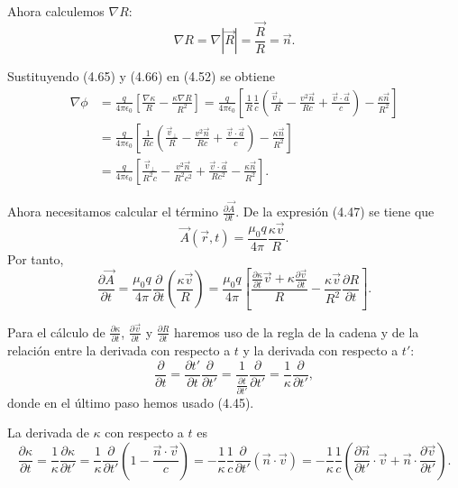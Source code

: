 \documentclass[12pt,a4paper]{book}
\begin{document}
Ahora calculemos $\nabla R$:
\begin{equation}
\nabla R = \nabla|\vec{R}| = \frac{\vec{R}}{R} = \vec{n}.
\end{equation}

Sustituyendo (4.65) y (4.66) en (4.52) se obtiene
\begin{align}
\nabla\phi &= \frac{q}{4\pi\epsilon_0}\left[\frac{\nabla\kappa}{R} - \frac{\kappa\nabla R}{R^2}\right] = \frac{q}{4\pi\epsilon_0}\left[\frac{1}{R}\frac{1}{c}\left(\frac{\vec{v}_{\perp}}{R} - \frac{v^2\vec{n}}{Rc} + \frac{\vec{v} \cdot \vec{a}}{c}\right) - \frac{\kappa\vec{n}}{R^2}\right] \nonumber \\
&= \frac{q}{4\pi\epsilon_0}\left[\frac{1}{Rc}\left(\frac{\vec{v}_{\perp}}{R} - \frac{v^2\vec{n}}{Rc} + \frac{\vec{v} \cdot \vec{a}}{c}\right) - \frac{\kappa\vec{n}}{R^2}\right] \nonumber \\
&= \frac{q}{4\pi\epsilon_0}\left[\frac{\vec{v}_{\perp}}{R^2c} - \frac{v^2\vec{n}}{R^2c^2} + \frac{\vec{v} \cdot \vec{a}}{Rc^2} - \frac{\kappa\vec{n}}{R^2}\right].
\end{align}

Ahora necesitamos calcular el término $\frac{\partial\vec{A}}{\partial t}$. De la expresión (4.47) se tiene que
\begin{equation}
\vec{A}(\vec{r}, t) = \frac{\mu_0 q}{4\pi}\frac{\kappa\vec{v}}{R}.
\end{equation}
Por tanto,
\begin{equation}
\frac{\partial\vec{A}}{\partial t} = \frac{\mu_0 q}{4\pi}\frac{\partial}{\partial t}\left(\frac{\kappa\vec{v}}{R}\right) = \frac{\mu_0 q}{4\pi}\left[\frac{\frac{\partial\kappa}{\partial t}\vec{v} + \kappa\frac{\partial\vec{v}}{\partial t}}{R} - \frac{\kappa\vec{v}}{R^2}\frac{\partial R}{\partial t}\right].
\end{equation}

Para el cálculo de $\frac{\partial\kappa}{\partial t}$, $\frac{\partial\vec{v}}{\partial t}$ y $\frac{\partial R}{\partial t}$ haremos uso de la regla de la cadena y de la relación entre la derivada con respecto a $t$ y la derivada con respecto a $t'$:
\begin{equation}
\frac{\partial}{\partial t} = \frac{\partial t'}{\partial t}\frac{\partial}{\partial t'} = \frac{1}{\frac{\partial t}{\partial t'}}\frac{\partial}{\partial t'} = \frac{1}{\kappa}\frac{\partial}{\partial t'},
\end{equation}
donde en el último paso hemos usado (4.45).

La derivada de $\kappa$ con respecto a $t$ es
\begin{equation}
\frac{\partial\kappa}{\partial t} = \frac{1}{\kappa}\frac{\partial\kappa}{\partial t'} = \frac{1}{\kappa}\frac{\partial}{\partial t'}\left(1 - \frac{\vec{n} \cdot \vec{v}}{c}\right) = -\frac{1}{\kappa}\frac{1}{c}\frac{\partial}{\partial t'}(\vec{n} \cdot \vec{v}) = -\frac{1}{\kappa}\frac{1}{c}\left(\frac{\partial\vec{n}}{\partial t'} \cdot \vec{v} + \vec{n} \cdot \frac{\partial\vec{v}}{\partial t'}\right).
\end{equation}
\end{document}
